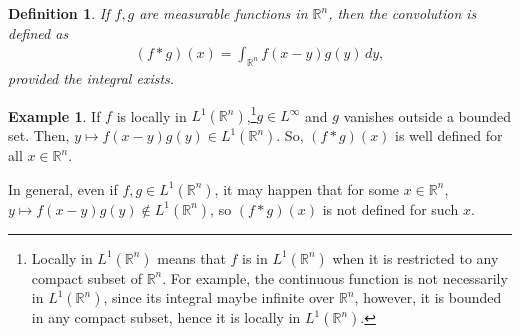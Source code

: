 \documentclass[11pt]{book}
\newtheorem{definition}{Definition}[chapter]
\theoremstyle{definition}
\newtheorem{example}{Example}[chapter]
\numberwithin{equation}{chapter}
\begin{document}
\medskip

\begin{definition}
If $f,g$ are measurable functions in $\mathbb{R}^n$, then the convolution is defined as
\begin{align*}
    (f*g)(x) = \int_{\mathbb{R}^n} f(x - y)g(y) \,dy,
\end{align*}
provided the integral exists.
\end{definition}

\medskip

\begin{example}\label{example_33}
If $f$ is locally in $L^1(\mathbb{R}^n)$,\footnote{Locally in $L^1(\mathbb{R}^n)$ means that $f$ is in $L^1(\mathbb{R}^n)$ when it is restricted to any compact subset of $\mathbb{R}^n$. For example, the continuous function is not necessarily in $L^1(\mathbb{R}^n)$, since its integral maybe infinite over $\mathbb{R}^n$, however, it is bounded in any compact subset, hence it is locally in $L^1(\mathbb{R}^n)$.}$g \in L^\infty$ and $g$ vanishes outside a bounded set. Then, $y \mapsto f(x-y)g(y) \in L^1(\mathbb{R}^n)$. So, $(f*g)(x)$ is well defined for all $x \in \mathbb{R}^n$.

In general, even if $f, g \in L^1(\mathbb{R}^n)$, it may happen that for some $x \in \mathbb{R}^n$, $y \mapsto f(x-y)g(y) \notin L^1(\mathbb{R}^n)$, so $(f*g)(x)$ is not defined for such $x$.
\end{example}

\medskip
\end{document}
